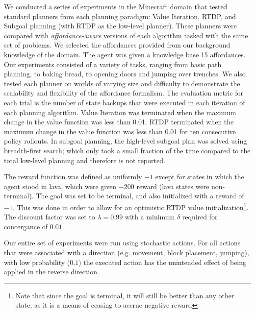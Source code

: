 \documentclass[]{article}
\newcommand{\stnote}[1]{\textcolor{Blue}{\textbf{ST: #1}}}
\begin{document}

We conducted a series of experiments in the Minecraft domain that
tested standard planners from each planning paradigm: Value Iteration,
RTDP, and Subgoal planning (with RTDP as the low-level planner). These
planners were compared with {\it affordance-aware} versions of each
algorithm tasked with the same set of problems. We selected the
affordances provided from our background knowledge of the domain. The
agent was given a knowledge base 15 affordances. Our experiments consisted of a
variety of tasks, ranging from basic path planning, to baking bread,
to opening doors and jumping over trenches.  We also tested each
planner on worlds of varying size and difficulty to demonstrate the
scalability and flexibility of the affordance formalism. The
evaluation metric for each trial is the number of state backups that
were executed in each iteration of each planning algorithm. Value
Iteration was terminated when the maximum change in the value function
was less than 0.01. RTDP terminated when the maximum change in the
value function was less than 0.01 for ten consecutive policy
rollouts. In subgoal planning, the high-level subgoal plan was solved
using breadth-first search; which only took a small fraction of the
time compared to the total low-level planning and therefore is not
reported.

The reward function was defined as uniformly $-1$ except for states in
which the agent stood in lava, which were given $-200$ reward (lava
states were non-terminal). The goal was set to be terminal, and also
initialized with a reward of $-1$. This was done in order to allow for
an optimistic RTDP value initialization\footnote{Note that since the
  goal is terminal, it will still be better than any other state, as
  it is a means of ceasing to accrue negative reward}. The discount
factor was set to $\lambda = 0.99$ with a minimum $\delta$ required
for concergance of $0.01$.


Our entire set of experiments were run using stochastic actions. For all actions that were associated with a direction (e.g. movement, block placement, jumping), with low probability ($0.1$) the executed action has the unintended effect of being applied in the reverse direction.
\end{document}
